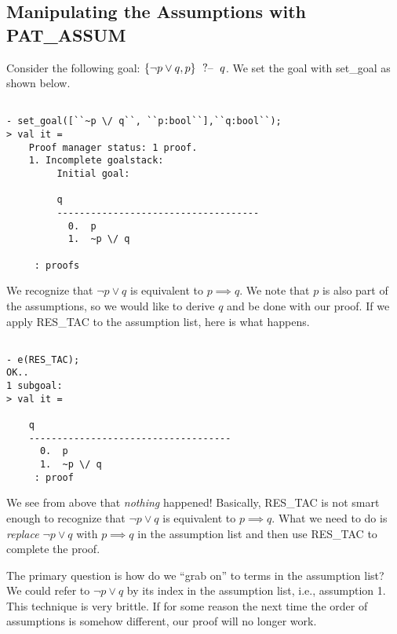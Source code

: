 \subsection{Manipulating the Assumptions with PAT\_ASSUM}

Consider the following goal: $\{\neg p \vee q, p\}\;\text{ ?-- }\;{q}$. We set the
goal with set\_goal as shown below.
\begin{session}
  \begin{scriptsize}
\begin{verbatim}

- set_goal([``~p \/ q``, ``p:bool``],``q:bool``);
> val it =
    Proof manager status: 1 proof.
    1. Incomplete goalstack:
         Initial goal:
         
         q
         ------------------------------------
           0.  p
           1.  ~p \/ q
         
     : proofs
\end{verbatim}
  \end{scriptsize}
\end{session}
We recognize that $\neg p \vee q$ is equivalent to $p \implies q$.  We
note that $p$ is also part of the assumptions, so we would like to
derive $q$ and be done with our proof.  If we apply RES\_TAC to the
assumption list, here is what happens.
\begin{session}
  \begin{scriptsize}
\begin{verbatim}

- e(RES_TAC);
OK..
1 subgoal:
> val it =
    
    q
    ------------------------------------
      0.  p
      1.  ~p \/ q
     : proof
\end{verbatim}
  \end{scriptsize}
\end{session}
We see from above that \emph{nothing} happened! Basically, RES\_TAC is
not smart enough to recognize that $\neg p \vee q$ is equivalent to $p
\implies q$.  What we need to do is \emph{replace} $\neg p \vee q$
with $p \implies q$ in the assumption list and then use RES\_TAC to
complete the proof.

The primary question is how do we ``grab on'' to terms in the
assumption list? We could refer to $\neg p \vee q$ by its index in the
assumption list, i.e., assumption 1.  This technique is very
brittle. If for some reason the next time the order of assumptions is
somehow different, our proof will no longer work.

